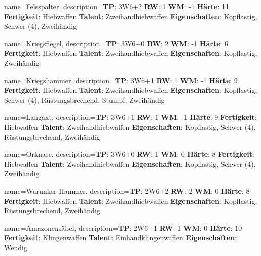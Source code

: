 {
    name={Felsspalter},
    description={\textbf{TP}: 3W6+2 \textbf{RW}: 1 \textbf{WM}: -1 \textbf{Härte}: 11        \textbf{Fertigkeit}: Hiebwaffen \textbf{Talent}: Zweihandhiebwaffen \textbf{{Eigenschaften}}: Kopflastig, Schwer (4), Zweihändig}
}



{
    name={Kriegsflegel},
    description={\textbf{TP}: 3W6+0 \textbf{RW}: 2 \textbf{WM}: -1 \textbf{Härte}: 6        \textbf{Fertigkeit}: Hiebwaffen \textbf{Talent}: Zweihandhiebwaffen \textbf{{Eigenschaften}}: Kopflastig, Zweihändig}
}



{
    name={Kriegshammer},
    description={\textbf{TP}: 3W6+1 \textbf{RW}: 1 \textbf{WM}: -1 \textbf{Härte}: 9        \textbf{Fertigkeit}: Hiebwaffen \textbf{Talent}: Zweihandhiebwaffen \textbf{{Eigenschaften}}: Kopflastig, Schwer (4), Rüstungsbrechend, Stumpf, Zweihändig}
}



{
    name={Langaxt},
    description={\textbf{TP}: 3W6+1 \textbf{RW}: 1 \textbf{WM}: -1 \textbf{Härte}: 9        \textbf{Fertigkeit}: Hiebwaffen \textbf{Talent}: Zweihandhiebwaffen \textbf{{Eigenschaften}}: Kopflastig, Schwer (4), Rüstungsbrechend, Zweihändig}
}



{
    name={Orknase},
    description={\textbf{TP}: 3W6+0 \textbf{RW}: 1 \textbf{WM}: 0 \textbf{Härte}: 8        \textbf{Fertigkeit}: Hiebwaffen \textbf{Talent}: Zweihandhiebwaffen \textbf{{Eigenschaften}}: Kopflastig, Schwer (4), Zweihändig}
}



{
    name={Warunker Hammer},
    description={\textbf{TP}: 2W6+2 \textbf{RW}: 2 \textbf{WM}: 0 \textbf{Härte}: 8        \textbf{Fertigkeit}: Hiebwaffen \textbf{Talent}: Zweihandhiebwaffen \textbf{{Eigenschaften}}: Kopflastig, Rüstungsbrechend, Zweihändig}
}



{
    name={Amazonensäbel},
    description={\textbf{TP}: 2W6+1 \textbf{RW}: 1 \textbf{WM}: 0 \textbf{Härte}: 10        \textbf{Fertigkeit}: Klingenwaffen \textbf{Talent}: Einhandklingenwaffen \textbf{{Eigenschaften}}: Wendig}
}



